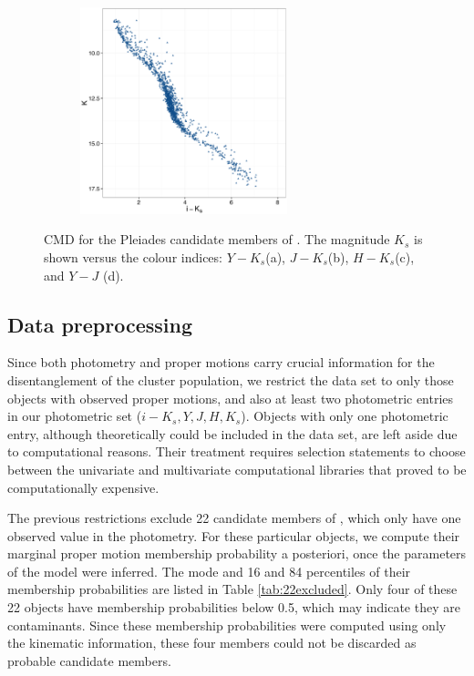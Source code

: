 \begin{figure}[ht!]
\begin{subfigure}[t]{0.45\textwidth}
    \end{subfigure}
     \begin{subfigure}[t]{0.45\textwidth}
      \includegraphics[page=5,height=6cm]{background/Figures/CIs.pdf}
        \caption{}
         
    \end{subfigure}
    \caption{CMD for the Pleiades candidate members of \citet{Bouy2015}. The magnitude $K_s$ is shown versus the colour indices: $Y-K_s$(a), $J-K_s$(b), $H-K_s$(c), and $Y-J$ (d).}
    \label{fig:otherCI}
\end{figure}


\subsection{Data preprocessing}
\label{sect:RDR2}
Since both photometry and proper motions carry crucial information for the disentanglement of the cluster population, we restrict the data set to only those objects with observed proper motions, and also at least two photometric entries in our photometric set ($i-K_s,Y,J,H,K_s$). {Objects with only one photometric entry, although theoretically could be included in the data set, are left aside due to computational reasons. Their treatment requires selection statements to choose between the univariate and multivariate computational libraries that proved to be computationally expensive.}

The previous restrictions exclude 22 candidate members of \citet{Bouy2015}, which only have one observed value in the photometry. For these particular objects, we compute their marginal proper motion membership probability a posteriori, once the parameters of the model were inferred. The mode and 16 and 84 percentiles of their membership probabilities are listed in Table \ref{tab:22excluded}. Only four of these 22 objects have membership probabilities below 0.5, which may indicate they are contaminants. Since these membership probabilities were computed using only the kinematic information, these four members could not be discarded as probable candidate members.

